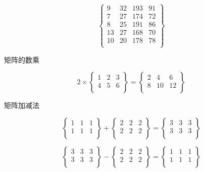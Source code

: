 \documentclass[UTF8,12pt]{ctexart}
\begin{document}
{\color{white} \LARGE
$$
\left\{
 \begin{matrix}
   9 & 32 & 193 & 91\\
   7 & 27 & 174 & 72\\
   8 & 25 & 191 & 86\\
   13 & 27 & 168 & 70\\
   10 & 20 & 178 & 78\\
  \end{matrix}
  \right\} 
$$
 }

矩阵的数乘

{\color{white} 
$$
2 \times \left\{
 \begin{matrix}
   1 & 2 & 3\\
   4 & 5 & 6\\
  \end{matrix}
  \right\}=\left\{
 \begin{matrix}
   2 & 4 & 6\\
   8 & 10 & 12\\
  \end{matrix}
  \right\}
$$
 }


矩阵加减法

{\color{white} 
$$
\left\{
 \begin{matrix}
   1 & 1 & 1\\
   1 & 1 & 1\\
  \end{matrix}
  \right\} + 
\left\{
 \begin{matrix}
   2 & 2 & 2\\
   2 & 2 & 2\\
  \end{matrix}
  \right\}=\left\{
 \begin{matrix}
   3 & 3 & 3\\
   3 & 3 & 3\\
  \end{matrix}
  \right\}
$$
 }

{\color{white} 
$$
\left\{
 \begin{matrix}
   3 & 3 & 3\\
   3 & 3 & 3\\
  \end{matrix}
  \right\} - 
\left\{
 \begin{matrix}
   2 & 2 & 2\\
   2 & 2 & 2\\
  \end{matrix}
  \right\}=\left\{
 \begin{matrix}
   1 & 1 & 1\\
   1 & 1 & 1\\
  \end{matrix}
  \right\}
$$
 }
\end{document}
